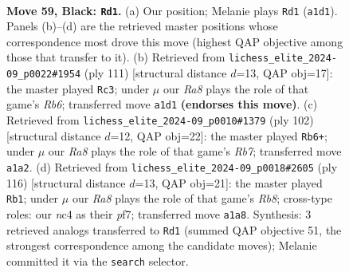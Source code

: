 \documentclass[11pt]{article}
\begin{document}
\clearpage

\begin{figure}[p]\centering
\begin{subfigure}{0.46\textwidth}\centering
\resizebox{\linewidth}{!}{%
\newchessgame
\chessboard[
  setfen={8/4R1p1/5pk1/7p/2NP3P/6P1/7K/r7 b - - 12 59},
  showmover=false,
  pgfstyle=straightmove, color=movearrow, markmove={a1-d1}
]}
\caption{}
\end{subfigure}\hfill
\begin{subfigure}{0.46\textwidth}\centering
\resizebox{\linewidth}{!}{%
\newchessgame
\chessboard[
  setfen={8/R5p1/5pk1/7p/5P1P/1r4P1/5K2/8 b - - 4 56},
  showmover=false,
  pgfstyle=straightmove, color=movearrow, markmove={b3-c3}
]}
\caption{}
\end{subfigure}
\\[4pt]
\begin{subfigure}{0.46\textwidth}\centering
\resizebox{\linewidth}{!}{%
\newchessgame
\chessboard[
  setfen={8/1R6/6k1/5p1p/7P/5PK1/3r2P1/8 w - - 22 52},
  showmover=false,
  pgfstyle=straightmove, color=movearrow, markmove={b7-b6}
]}
\caption{}
\end{subfigure}\hfill
\begin{subfigure}{0.46\textwidth}\centering
\resizebox{\linewidth}{!}{%
\newchessgame
\chessboard[
  setfen={1R6/5pk1/6p1/7p/4P2P/5PK1/2r3P1/8 w - - 39 59},
  showmover=false,
  pgfstyle=straightmove, color=movearrow, markmove={b8-b1}
]}
\caption{}
\end{subfigure}
\caption{\textbf{Move 59, Black: \texttt{Rd1}.} (a) Our position; Melanie plays \texttt{Rd1} (\texttt{a1d1}). Panels (b)--(d) are the retrieved master positions whose correspondence most drove this move (highest QAP objective among those that transfer to it). (b) Retrieved from \texttt{lichess\_elite\_2024-09\_p0022\#1954} (ply 111) [structural distance $d$=13, QAP obj=17]: the master played \texttt{Rc3}; under $\mu$ our \emph{Ra8} plays the role of that game's \emph{Rb6}; transferred move \texttt{a1d1} \textbf{(endorses this move)}. (c) Retrieved from \texttt{lichess\_elite\_2024-09\_p0010\#1379} (ply 102) [structural distance $d$=12, QAP obj=22]: the master played \texttt{Rb6+}; under $\mu$ our \emph{Ra8} plays the role of that game's \emph{Rb7}; transferred move \texttt{a1a2}. (d) Retrieved from \texttt{lichess\_elite\_2024-09\_p0018\#2605} (ply 116) [structural distance $d$=13, QAP obj=21]: the master played \texttt{Rb1}; under $\mu$ our \emph{Ra8} plays the role of that game's \emph{Rb8}; cross-type roles: our \emph{n}c4 as their \emph{p}f7; transferred move \texttt{a1a8}. Synthesis: 3 retrieved analogs transferred to \texttt{Rd1} (summed QAP objective 51, the strongest correspondence among the candidate moves); Melanie committed it via the \texttt{search} selector.}
\label{fig:thought-m117}
\end{figure}
\end{document}
